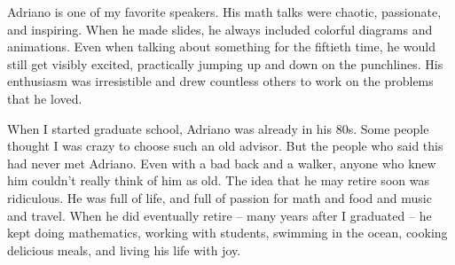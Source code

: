 \documentclass{notices}
\begin{document}
Adriano is one of my favorite speakers. His math talks were chaotic, passionate, and inspiring. When he made slides, he always included colorful diagrams and animations. Even when talking about something for the fiftieth time, he would still get visibly excited, practically jumping up and down on the punchlines. His enthusiasm was irresistible and drew countless others to work on the problems that he loved.

When I started graduate school, Adriano was already in his 80s. Some people thought I was crazy to choose such an old advisor. But the people who said this had never met Adriano. Even with a bad back and a walker, anyone who knew him couldn't really think of him as old. The idea that he may retire soon was ridiculous. He was full of life, and full of passion for math and food and music and travel. When he did eventually retire – many years after I graduated – he kept doing mathematics, working with students, swimming in the ocean, cooking delicious meals, and living his life with joy.
\end{document}
